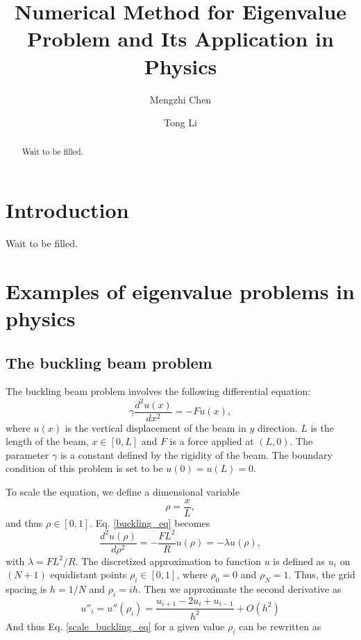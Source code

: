 \documentclass{article}
\title{Numerical Method for Eigenvalue Problem and Its Application in Physics}
\author[1]{Mengzhi Chen}
\author[1]{Tong Li}
\affil[1]{Department of Physics and Astronomy, Michigan State University}
\date{}
\begin{document}
	\maketitle
	\begin{abstract}\label{abstract}
	Wait to be filled. 
	\end{abstract}

	\section{Introduction}\label{intro}
    Wait to be filled. 
	
	\section{Examples of eigenvalue problems in physics}\label{physcis_problem}
	\subsection{The buckling beam problem}\label{buckling_sec}
The buckling beam problem involves the following differential equation: 
\begin{equation}
\label{buckling_eq}
\gamma \frac{d^2 u(x)}{dx^2} = -F u(x),
\end{equation}
where $u(x)$ is the vertical displacement of the beam in $y$ direction. 
$L$ is the length of the beam, $x\in [0,L]$ and $F$ is a force applied at $(L,0)$. 
The parameter $\gamma$ is a constant defined by the rigidity of the beam. 
The boundary condition of this problem is set to be $u(0)=u(L)=0$. 
\par
To scale the equation, we define a dimensional variable
\[
\rho = \frac{x}{L}, 
\]
and thus $\rho \in [0,1]$. 
Eq. \ref{buckling_eq} becomes 
\begin{equation}\label{scale_buckling_eq}
\frac{d^2 u(\rho)}{d\rho^2} = -\frac{FL^2}{R} u(\rho)=-\lambda u(\rho),
\end{equation}
with $\lambda= FL^2/R$.
The discretized approximation to function $u$ is defined as $u_i$ 
on $(N+1)$ equidistant points $\rho_i \in [0,1]$, 
where $\rho_0=0$ and $\rho_N=1$. Thus, the grid spacing is $h=1/N$ and $\rho_i=ih$. 
Then we approximate the second derivative as 
\begin{equation}
u''_i=u''(\rho_i)=\frac{u_{i+1} -2u_i +u_{i-1}}{h^2} +O(h^2)
\label{eq:diffoperation}
\end{equation}
And thus Eq. \ref{scale_buckling_eq} for a given value $\rho_i$ can be rewritten as 
\end{document}
